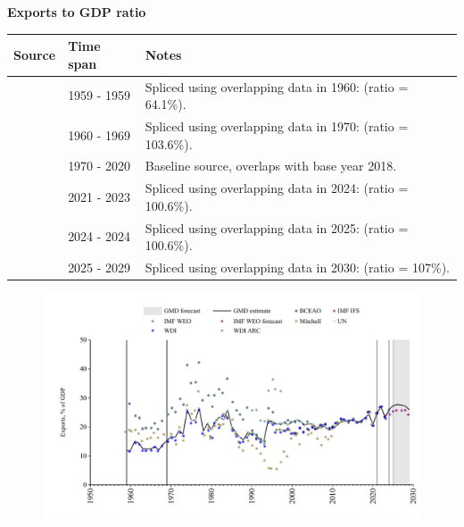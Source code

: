 \documentclass[12pt,a4paper,landscape]{article}
\begin{document}
\begin{adjustbox}{max totalsize={\paperwidth}{\paperheight},center}
\begin{minipage}[t][\textheight][t]{\textwidth}
\vspace*{0.5cm}
{}
\begin{center}
{\Large\bfseries Exports to GDP ratio}
\end{center}
\vspace{0.5cm}
\begin{table}[H]
\centering
\small
\begin{tabular}{|l|l|l|}
\hline
\textbf{Source} & \textbf{Time span} & \textbf{Notes} \\
\hline
\rowcolor{white}\cite{Mitchell}& 1959 - 1959 &Spliced using overlapping data in 1960: (ratio = 64.1\%). \\
\rowcolor{lightgray}\cite{WDI}& 1960 - 1969 &Spliced using overlapping data in 1970: (ratio = 103.6\%). \\
\rowcolor{white}\cite{UN}& 1970 - 2020 &Baseline source, overlaps with base year 2018. \\
\rowcolor{lightgray}\cite{WDI}& 2021 - 2023 &Spliced using overlapping data in 2024: (ratio = 100.6\%). \\
\rowcolor{white}\cite{BCEAO}& 2024 - 2024 &Spliced using overlapping data in 2025: (ratio = 100.6\%). \\
\rowcolor{lightgray}\cite{IMF_WEO_forecast}& 2025 - 2029 &Spliced using overlapping data in 2030: (ratio = 107\%). \\
\hline
\end{tabular}
\end{table}
\begin{figure}[H]
\centering
\includegraphics[width=\textwidth,height=0.6\textheight,keepaspectratio]{graphs/SEN_exports_GDP.pdf}
\end{figure}
\end{minipage}
\end{adjustbox}
\end{document}
